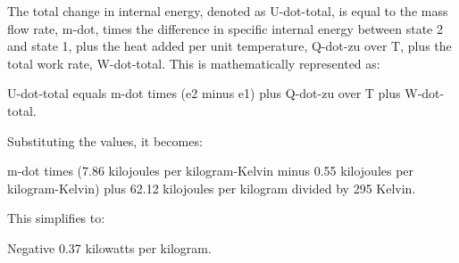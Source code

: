 The total change in internal energy, denoted as U-dot-total, is equal to the mass flow rate, m-dot, times the difference in specific internal energy between state 2 and state 1, plus the heat added per unit temperature, Q-dot-zu over T, plus the total work rate, W-dot-total. This is mathematically represented as:

U-dot-total equals m-dot times (e2 minus e1) plus Q-dot-zu over T plus W-dot-total.

Substituting the values, it becomes:

m-dot times (7.86 kilojoules per kilogram-Kelvin minus 0.55 kilojoules per kilogram-Kelvin) plus 62.12 kilojoules per kilogram divided by 295 Kelvin.

This simplifies to:

Negative 0.37 kilowatts per kilogram.